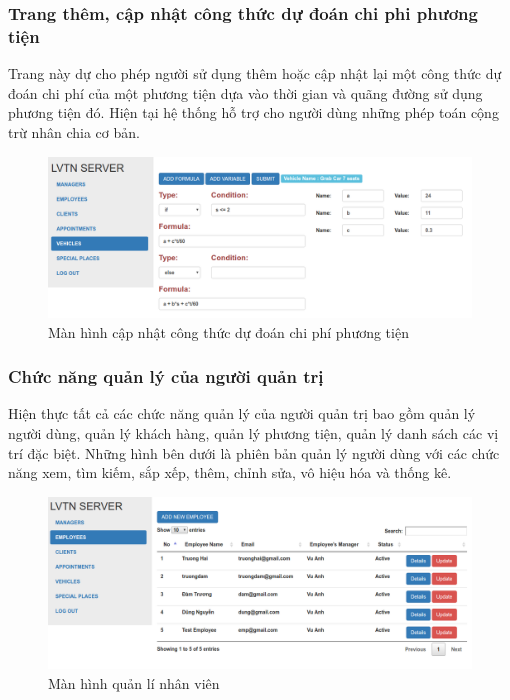\documentclass{article}
\begin{document}
\subsubsection{Trang thêm, cập nhật công thức dự đoán chi phi phương tiện}
Trang này dự cho phép người sử dụng thêm hoặc cập nhật lại một công thức dự đoán chi phí của một phương tiện dựa vào thời gian và quãng đường sử dụng phương tiện đó. Hiện
tại hệ thống hỗ trợ cho người dùng những phép toán cộng trừ nhân chia cơ bản.

\begin{figure}[H]
\centering
\includegraphics[scale=0.5]{admin_chiphi}
\caption{Màn hình cập nhật công thức dự đoán chi phí phương tiện}
\end{figure}


\subsubsection{Chức năng quản lý của người quản trị}
Hiện thực tất cả các chức năng quản lý của người quản trị bao gồm quản lý người dùng, quản lý khách hàng, quản lý phương tiện, quản lý danh sách các vị trí đặc biệt.
Những hình bên dưới là phiên bản quản lý người dùng với các chức năng xem, tìm kiếm, sắp xếp, thêm, chỉnh sửa, vô hiệu hóa và thống kê.

\begin{figure}[H]
\centering
\includegraphics[scale=0.5]{admin_employee}
\caption{Màn hình quản lí nhân viên}
\end{figure}
\end{document}
